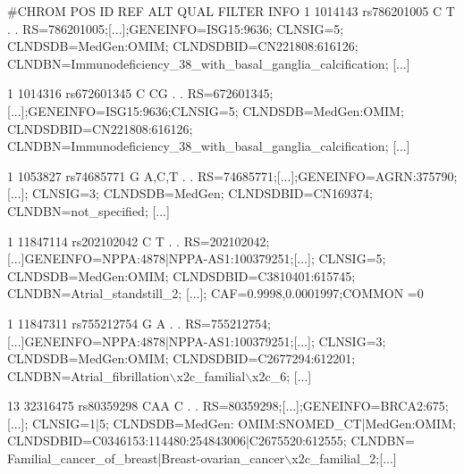 \begin{DoxyCode}
\textcolor{preprocessor}{#CHROM  POS ID  REF ALT QUAL  FILTER  INFO}
\textcolor{preprocessor}{}
1 1014143 rs786201005 C T . . RS=786201005;[...];GENEINFO=ISG15:9636; CLNSIG=5; CLNDSDB=MedGen:OMIM; 
      CLNDSDBID=CN221808:616126; CLNDBN=Immunodeficiency\_38\_with\_basal\_ganglia\_calcification; [...]

1 1014316 rs672601345 C CG  . . RS=672601345;[...];GENEINFO=ISG15:9636;CLNSIG=5; CLNDSDB=MedGen:OMIM; 
      CLNDSDBID=CN221808:616126; CLNDBN=Immunodeficiency\_38\_with\_basal\_ganglia\_calcification; [...]

1 1053827 rs74685771  G A,C,T . . RS=74685771;[...];GENEINFO=AGRN:375790;[...]; CLNSIG=3; CLNDSDB=MedGen; 
      CLNDSDBID=CN169374; CLNDBN=not\_specified; [...]

1 11847114  rs202102042 C T . . RS=202102042;[...]GENEINFO=NPPA:4878|NPPA-AS1:100379251;[...]; CLNSIG=5; 
      CLNDSDB=MedGen:OMIM; CLNDSDBID=C3810401:615745; CLNDBN=Atrial\_standstill\_2; [...]; CAF=0.9998,0.0001997;COMMON
      =0

1 11847311  rs755212754 G A . . RS=755212754;[...]GENEINFO=NPPA:4878|NPPA-AS1:100379251;[...]; CLNSIG=3; 
      CLNDSDB=MedGen:OMIM; CLNDSDBID=C2677294:612201; CLNDBN=Atrial\_fibrillation\(\backslash\)x2c\_familial\(\backslash\)x2c\_6; [...]

13  32316475  rs80359298  CAA C . . RS=80359298;[...];GENEINFO=BRCA2:675;[...]; CLNSIG=1|5; CLNDSDB=MedGen:
      OMIM:SNOMED\_CT|MedGen:OMIM; CLNDSDBID=C0346153:114480:254843006|C2675520:612555; CLNDBN=
      Familial\_cancer\_of\_breast|Breast-ovarian\_cancer\(\backslash\)x2c\_familial\_2;[...]
\end{DoxyCode}


